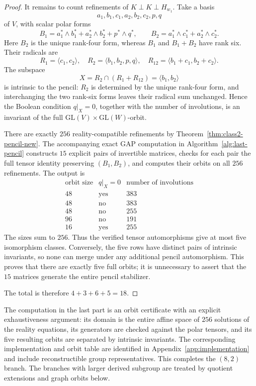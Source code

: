 \documentclass[11pt,a4paper]{amsart}
\theoremstyle{definition}
\theoremstyle{remark}
\numberwithin{equation}{section}
\begin{document}
\begin{proof}
It remains to count refinements of $K\perp K\perp H_{w_1}$.
Take a basis
\[
 a_1,b_1,c_1,a_2,b_2,c_2,p,q
\]
of $V$, with scalar polar forms
\[
 B_1=a_1^*\wedge b_1^*+a_2^*\wedge b_2^*+p^*\wedge q^*,
 \qquad
 B_2=a_1^*\wedge c_1^*+a_2^*\wedge c_2^*.
\]
Here $B_2$ is the unique rank-four form, whereas $B_1$ and
$B_1+B_2$ have rank six. Their radicals are
\[
 R_1=\langle c_1,c_2\rangle,\quad
 R_2=\langle b_1,b_2,p,q\rangle,\quad
 R_{12}=\langle b_1+c_1,b_2+c_2\rangle.
\]
The subspace
\begin{equation}\label{eq:lastpencil-X-new}
 X=R_2\cap(R_1+R_{12})=\langle b_1,b_2\rangle
\end{equation}
is intrinsic to the pencil: $R_2$ is determined by the unique
rank-four form, and interchanging the two rank-six forms leaves
their radical sum unchanged. Hence the Boolean condition
$q|_X=0$, together with the number of involutions, is an invariant
of the full $\mathrm{GL}(V)\times\mathrm{GL}(W)$-orbit.

There are exactly $256$ reality-compatible refinements by
Theorem~\ref{thm:class2-pencil-new}. The accompanying exact GAP computation in Algorithm~\ref{alg:last-pencil} constructs
$15$ explicit pairs of invertible matrices, checks for each pair
the full tensor identity preserving $(B_1,B_2)$, and computes their
orbits on all $256$ refinements. The output is
\[
\begin{array}{c|c|c}
 \text{orbit size}&q|_X=0&\text{number of involutions}\\\hline
 48&\text{yes}&383\\
 48&\text{no}&383\\
 48&\text{no}&255\\
 96&\text{no}&191\\
 16&\text{yes}&255
\end{array}
\]
The sizes sum to $256$. Thus the verified tensor automorphisms give
at most five isomorphism classes. Conversely, the five rows have
distinct pairs of intrinsic invariants, so none can merge under
any additional pencil automorphism. This proves that there are
exactly five full orbits; it is unnecessary to assert that the
$15$ matrices generate the entire pencil stabilizer.

The total is therefore $4+3+6+5=18$.
\end{proof}

The computation in the last part is an orbit certificate with an
explicit exhaustiveness argument: its domain is the entire affine
space of $256$ solutions of the reality equations, its generators
are checked against the polar tensors, and its five resulting
orbits are separated by intrinsic invariants. The corresponding implementation and orbit table are identified in
Appendix~\ref{app:implementation} and include reconstructible group
representatives. This completes the $(8,2)$ branch. The branches with larger derived
subgroup are treated by quotient extensions and graph orbits below.
\end{document}

